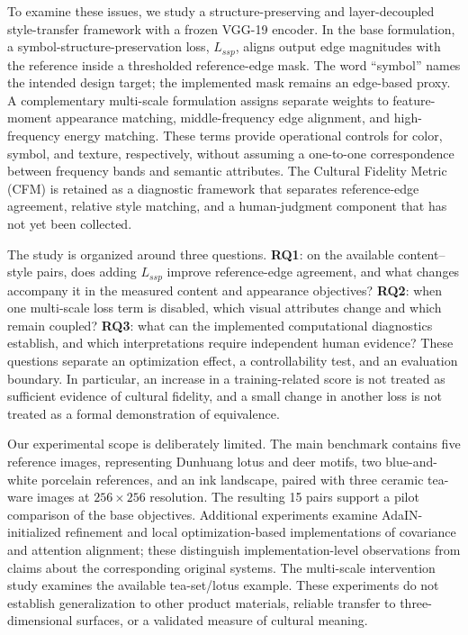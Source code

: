 \documentclass[manuscript,acmlarge,screen,review]{acmart}
\begin{document}
To examine these issues, we study a structure-preserving and layer-decoupled style-transfer framework with a frozen VGG-19 encoder. In the base formulation, a symbol-structure-preservation loss, $L_{ssp}$, aligns output edge magnitudes with the reference inside a thresholded reference-edge mask. The word ``symbol'' names the intended design target; the implemented mask remains an edge-based proxy. A complementary multi-scale formulation assigns separate weights to feature-moment appearance matching, middle-frequency edge alignment, and high-frequency energy matching. These terms provide operational controls for color, symbol, and texture, respectively, without assuming a one-to-one correspondence between frequency bands and semantic attributes. The Cultural Fidelity Metric (CFM) is retained as a diagnostic framework that separates reference-edge agreement, relative style matching, and a human-judgment component that has not yet been collected.

The study is organized around three questions. \textbf{RQ1}: on the available content--style pairs, does adding $L_{ssp}$ improve reference-edge agreement, and what changes accompany it in the measured content and appearance objectives? \textbf{RQ2}: when one multi-scale loss term is disabled, which visual attributes change and which remain coupled? \textbf{RQ3}: what can the implemented computational diagnostics establish, and which interpretations require independent human evidence? These questions separate an optimization effect, a controllability test, and an evaluation boundary. In particular, an increase in a training-related score is not treated as sufficient evidence of cultural fidelity, and a small change in another loss is not treated as a formal demonstration of equivalence.

Our experimental scope is deliberately limited. The main benchmark contains five reference images, representing Dunhuang lotus and deer motifs, two blue-and-white porcelain references, and an ink landscape, paired with three ceramic tea-ware images at $256\times256$ resolution. The resulting 15 pairs support a pilot comparison of the base objectives. Additional experiments examine AdaIN-initialized refinement and local optimization-based implementations of covariance and attention alignment; these distinguish implementation-level observations from claims about the corresponding original systems. The multi-scale intervention study examines the available tea-set/lotus example. These experiments do not establish generalization to other product materials, reliable transfer to three-dimensional surfaces, or a validated measure of cultural meaning.
\end{document}

